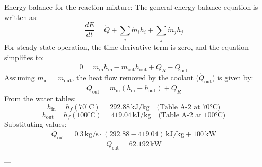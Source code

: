 Energy balance for the reaction mixture:  
The general energy balance equation is written as:  
\[
\frac{dE}{dt} = \dot{Q} + \sum_i \dot{m}_i h_i + \sum_j \dot{m}_j h_j
\]  
For steady-state operation, the time derivative term is zero, and the equation simplifies to:  
\[
0 = \dot{m}_{\text{in}} h_{\text{in}} - \dot{m}_{\text{out}} h_{\text{out}} + \dot{Q}_R - \dot{Q}_{\text{out}}
\]  
Assuming \( \dot{m}_{\text{in}} = \dot{m}_{\text{out}} \), the heat flow removed by the coolant (\( \dot{Q}_{\text{out}} \)) is given by:  
\[
\dot{Q}_{\text{out}} = \dot{m}_{\text{in}} (h_{\text{in}} - h_{\text{out}}) + \dot{Q}_R
\]  
From the water tables:  
\[
h_{\text{in}} = h_f(70^\circ\text{C}) = 292.88 \, \text{kJ/kg} \quad \text{(Table A-2 at 70°C)}
\]  
\[
h_{\text{out}} = h_f(100^\circ\text{C}) = 419.04 \, \text{kJ/kg} \quad \text{(Table A-2 at 100°C)}
\]  
Substituting values:  
\[
\dot{Q}_{\text{out}} = 0.3 \, \text{kg/s} \cdot (292.88 - 419.04) \, \text{kJ/kg} + 100 \, \text{kW}
\]  
\[
\dot{Q}_{\text{out}} = 62.192 \, \text{kW}
\]  

---